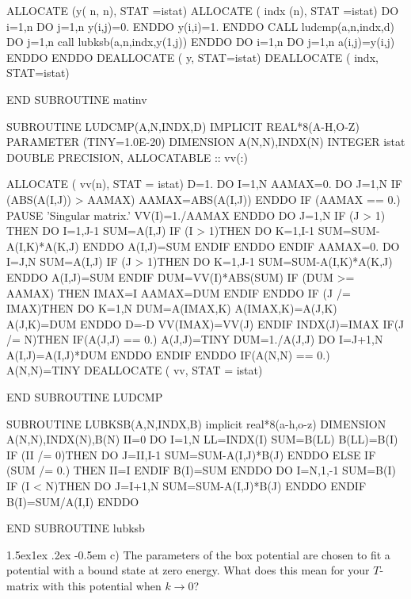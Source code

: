 \documentclass[%
oneside,                 %
final,                   %
10pt]{article}
\makeatletter
\newenvironment{doconceexercise}{}{}
\newcommand\subex{\@startsection{paragraph}{4}{\z@}%
                  {1.5ex\@plus1ex \@minus.2ex}%
                  {-0.5em}%
                  {\normalfont\normalsize\bfseries}}
\makeatother
\begin{document}
\begin{doconceexercise}
      ALLOCATE (y( n, n), STAT =istat)
      ALLOCATE ( indx (n), STAT =istat)
      DO i=1,n
         DO j=1,n
            y(i,j)=0.
         ENDDO
         y(i,i)=1.
      ENDDO
      CALL  ludcmp(a,n,indx,d)
      DO j=1,n
         call lubksb(a,n,indx,y(1,j))
      ENDDO
      DO i=1,n
         DO j=1,n
            a(i,j)=y(i,j)
         ENDDO
      ENDDO
      DEALLOCATE ( y, STAT=istat)
      DEALLOCATE ( indx, STAT=istat)

      END SUBROUTINE matinv
 

      SUBROUTINE LUDCMP(A,N,INDX,D)
      IMPLICIT REAL*8(A-H,O-Z)
      PARAMETER (TINY=1.0E-20)
      DIMENSION A(N,N),INDX(N)
      INTEGER istat
      DOUBLE PRECISION, ALLOCATABLE :: vv(:)

      ALLOCATE ( vv(n), STAT = istat)
      D=1.
      DO I=1,N
         AAMAX=0.
         DO J=1,N
            IF (ABS(A(I,J)) > AAMAX) AAMAX=ABS(A(I,J))
         ENDDO
         IF (AAMAX == 0.) PAUSE 'Singular matrix.'
         VV(I)=1./AAMAX
      ENDDO
      DO J=1,N
         IF (J > 1) THEN
            DO I=1,J-1
               SUM=A(I,J)
               IF (I > 1)THEN
                  DO K=1,I-1
                     SUM=SUM-A(I,K)*A(K,J)
                  ENDDO
                  A(I,J)=SUM
               ENDIF
            ENDDO
         ENDIF
         AAMAX=0.
         DO I=J,N
            SUM=A(I,J)
            IF (J > 1)THEN
               DO K=1,J-1
                  SUM=SUM-A(I,K)*A(K,J)
               ENDDO
               A(I,J)=SUM
            ENDIF
            DUM=VV(I)*ABS(SUM)
            IF (DUM >= AAMAX) THEN
               IMAX=I
               AAMAX=DUM
            ENDIF
         ENDDO
         IF (J /= IMAX)THEN
            DO K=1,N
               DUM=A(IMAX,K)
               A(IMAX,K)=A(J,K)
               A(J,K)=DUM
            ENDDO
            D=-D
            VV(IMAX)=VV(J)
         ENDIF
         INDX(J)=IMAX
         IF(J /= N)THEN
            IF(A(J,J) == 0.) A(J,J)=TINY
            DUM=1./A(J,J)
            DO I=J+1,N
               A(I,J)=A(I,J)*DUM
            ENDDO
         ENDIF
      ENDDO
      IF(A(N,N) == 0.)  A(N,N)=TINY
      DEALLOCATE ( vv, STAT = istat)

      END SUBROUTINE LUDCMP
 
      SUBROUTINE LUBKSB(A,N,INDX,B)
      implicit real*8(a-h,o-z)
      DIMENSION A(N,N),INDX(N),B(N)
      II=0
      DO I=1,N
         LL=INDX(I)
         SUM=B(LL)
         B(LL)=B(I)
         IF (II /= 0)THEN
            DO J=II,I-1
               SUM=SUM-A(I,J)*B(J)
            ENDDO
         ELSE IF (SUM /= 0.) THEN
            II=I
         ENDIF
         B(I)=SUM
      ENDDO
      DO I=N,1,-1
         SUM=B(I)
         IF (I < N)THEN
            DO J=I+1,N
               SUM=SUM-A(I,J)*B(J)
            ENDDO
         ENDIF
         B(I)=SUM/A(I,I)
      ENDDO

      END SUBROUTINE lubksb
\efcod


\subex{c)}
The parameters of the box potential are chosen to fit a
potential with a bound state at zero energy. What does this mean
for your $T$-matrix with this potential when
$k\rightarrow 0$?

\end{doconceexercise}




\printindex
\end{document}
